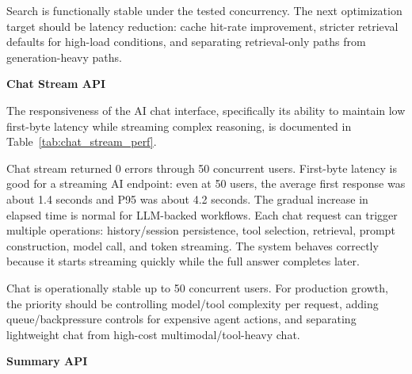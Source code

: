Search is functionally stable under the tested concurrency. The next optimization target should be latency reduction: cache hit-rate improvement, stricter retrieval defaults for high-load conditions, and separating retrieval-only paths from generation-heavy paths.

\textbf{Chat Stream API}

The responsiveness of the AI chat interface, specifically its ability to maintain low first-byte latency while streaming complex reasoning, is documented in Table~\ref{tab:chat_stream_perf}.

\begin{table}[H]
    \centering
    \caption{Chat Stream Performance Matrix (Full Request).}
    \label{tab:chat_stream_perf}
\end{table}

Chat stream returned 0 errors through 50 concurrent users. First-byte latency is good for a streaming AI endpoint: even at 50 users, the average first response was about 1.4 seconds and P95 was about 4.2 seconds. The gradual increase in elapsed time is normal for LLM-backed workflows. Each chat request can trigger multiple operations: history/session persistence, tool selection, retrieval, prompt construction, model call, and token streaming. The system behaves correctly because it starts streaming quickly while the full answer completes later.

Chat is operationally stable up to 50 concurrent users. For production growth, the priority should be controlling model/tool complexity per request, adding queue/backpressure controls for expensive agent actions, and separating lightweight chat from high-cost multimodal/tool-heavy chat.



\textbf{Summary API}


